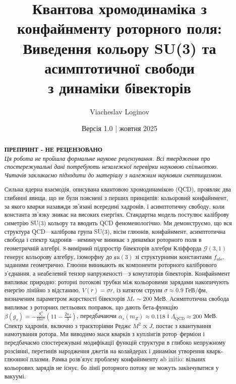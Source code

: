 \documentclass[11pt,a4paper]{article}
\title{\textbf{Квантова хромодинаміка з конфайнменту роторного поля:\\
Виведення кольору SU(3) та асимптотичної свободи\\
з динаміки бівекторів}}
\author[1]{Viacheslav Loginov}
\affil[1]{Київ, Україна\\ \texttt{barthez.slavik@gmail.com}}
\date{\small Версія 1.0 \quad|\quad 15 жовтня 2025}
\newcommand{\Cl}{\mathcal{G}}
\theoremstyle{definition}
\theoremstyle{plain}
\theoremstyle{remark}
\begin{document}
\maketitle

\begin{abstract}
\noindent
\textbf{ПРЕПРИНТ - НЕ РЕЦЕНЗОВАНО}\\
\textit{Ця робота не пройшла формальне наукове рецензування. Всі твердження про спостережувальні дані потребують незалежної перевірки науковою спільнотою. Читачів закликаємо підходити до матеріалу з належним науковим скептицизмом.}

\medskip
\noindent\noindent
Сильна ядерна взаємодія, описувана квантовою хромодинамікою (QCD), проявляє два глибинні явища, що не були пояснені з перших принципів: кольоровий конфайнмент, за якого кварки назавжди зв’язані всередині хадронів, і асимптотичну свободу, коли константа зв’язку зникає на високих енергіях. Стандартна модель постулює каліброву симетрію SU(3) кольору та вводить QCD феноменологічно. Ми демонструємо, що вся структура QCD—каліброва група SU(3), вісім глюонів, конфайнмент, асимптотична свобода і спектр хадронів—неминуче виникає з динаміки роторного поля в геометричній алгебрі. 8-вимірний підпростір бівекторів алгебри Кліффорда $\Cl(3,1)$ генерує кольорову алгебру, ізоморфну до $\mathfrak{su}(3)$ зі структурними константами $f_{abc}$, заданими геометрично. Глюони виникають як компоненти роторного калібрового з’єднання, а неабелевий тензор напруженості—з комутаторів бівекторів. Конфайнмент випливає природно: роторні потокові трубки між кольоровими зарядами накопичують енергію лінійно з відстанню, $V(r)=\sigma r$, із натягом струни $\sigma \approx 0{.}9$ ГеВ/фм, визначеним параметром жорсткості бівекторів $M_\ast \sim 200$ МеВ. Асимптотична свобода випливає з роторних петльових поправок, що дають бета-функцію $\beta(g_s) = -\frac{g_s^3}{16\pi^2}(11 - \frac{2n_f}{3})$, передбачаючи $\alpha_s(m_Z) \approx 0{.}118$ і $\Lambda_{\mathrm{QCD}} \approx 200$ МеВ. Спектр хадронів, включно з траєкторіями Реджє $M^2 \propto J$, постає з квантування намотування ротора. Ми виводимо маси кварків з куплінгів ротор–ферміон і передбачаємо спостережувані модифікації функцій структури в глибоко непружному розсіянні, перетинів народження джетів на колайдерах і динаміки утворення кварк-глюонної плазми. Рамка розв’язує проблему конфайнменту ab initio: вільних кольорових зарядів не існує, бо лінії роторного потоку не можуть закінчуватися у вакуумі.
\end{abstract}
\end{document}

